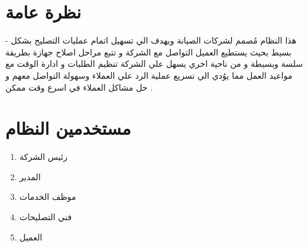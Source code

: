 \documentclass[25pt]{article}
\title{\Huge\centering{الصيانة}}
\author{عمر محمد}
\date{6102-21 مارس }
\begin{document}
	\maketitle
	\section{نظرة عامة}
	- هذا النظام مُصمم لشركات الصيانة ويهدف الي تسهيل اتمام عمليات التصليح بشكل بسيط بحيث يستطيع العميل التواصل مع الشركة و تتبع مراحل اصلاح جهازة بطريقة سلسة وبسيطة و من ناحية اخري يسهل علي الشركة تنظيم الطلبات و ادارة الوقت مع مواعيد العمل مما يوُدي الي تسريع عملية الرد علي العملاء وسهولة التواصل معهم و حل مشاكل العملاء في اسرع وقت ممكن .  
	\newline
	\large\section{مستخدمين النظام}
		\begin{enumerate}
			\item رئيس الشركة
			\item المدير 
			\item موظف الخدمات
			\item فني التصليحات 
			\item العميل
		\end{enumerate}
\end{document}
